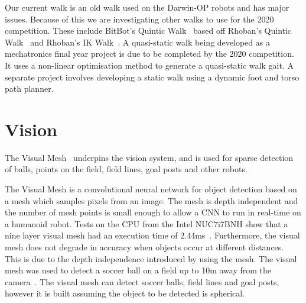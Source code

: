 \documentclass{llncs}
\begin{document}
Our current walk is an old walk used on the Darwin-OP robots and has major issues. Because of this we are investigating other walks to use for the 2020 competition. These include BitBot's Quintic Walk~\cite{bitbotsMotionGit} based off Rhoban's Quintic Walk~\cite{rhobanModelGit} and Rhoban's IK Walk~\cite{rhobanModelGit}. A quasi-static walk being developed as a mechatronics final year project is due to be completed by the 2020 competition. It uses a non-linear optimisation method to generate a quasi-static walk gait. A separate project involves developing a static walk using a dynamic foot and torso path planner. 

\section{Vision}



\medskip

The Visual Mesh~\cite{Houliston2018VisualMR} underpins the vision system, and is used for sparse detection of balls, points on the field, field lines, goal posts and other robots.

The Visual Mesh is a convolutional neural network for object detection based on a mesh which samples pixels from an image. The mesh is depth independent and the number of mesh points is small enough to allow a CNN to run in real-time on a humanoid robot. Tests on the CPU from the Intel\textsuperscript{\textregistered} NUC7i7BNH show that a nine layer visual mesh had an execution time of 2.44ms~\cite{Houliston2018VisualMR}. Furthermore, the visual mesh does not degrade in accuracy when objects occur at different distances. This is due to the depth independence introduced by using the mesh. The visual mesh was used to detect a soccer ball on a field up to 10m away from the camera~\cite{Houliston2018VisualMR}. The visual mesh can detect soccer balls, field lines and goal posts, however it is built assuming the object to be detected is spherical.
\end{document}
